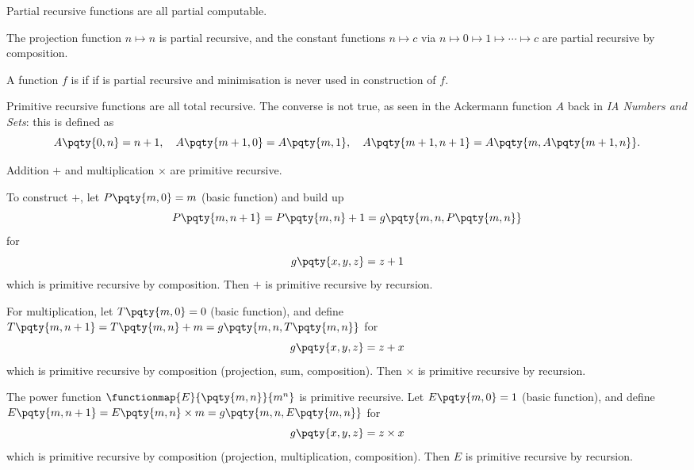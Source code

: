 Partial recursive functions are all partial computable.

\begin{example*}
    The projection function \(n \mapsto n\) is partial recursive, and the constant functions \(n \mapsto c\) via \(n \mapsto 0 \mapsto 1 \mapsto \cdots \mapsto c\) are partial recursive by composition.
\end{example*}

\begin{definition}
    A function \(f\) is  if if is partial recursive and minimisation is never used in construction of \(f\).
\end{definition}

Primitive recursive functions are all total recursive. The converse is not true, as seen in the Ackermann function \(A\) back in \textit{IA Numbers and Sets}: this is defined as
\[
    A\pqty{0, n} = n + 1, \quad A\pqty{m + 1, 0} = A\pqty{m, 1}, \quad A\pqty{m + 1, n + 1} = A\pqty{m, A\pqty{m + 1, n}}.
\]

\begin{example}
    \label{ex:primitive-recursive-addition-multiplication}%
    Addition \(+\) and multiplication \(\times\) are primitive recursive.

    To construct \(+\), let \(P\pqty{m, 0} = m\) (basic function) and build up
    \[
        P\pqty{m, n + 1} = P\pqty{m, n} + 1 = g\pqty{m, n, P\pqty{m, n}}
    \]
    for
    \[
        g\pqty{x, y, z} = z + 1
    \]
    which is primitive recursive by composition. Then \(+\) is primitive recursive by recursion.

    For multiplication, let \(T\pqty{m, 0} = 0\) (basic function), and define \(T\pqty{m, n + 1} = T\pqty{m, n} + m = g\pqty{m, n, T\pqty{m, n}}\) for
    \[
        g\pqty{x, y, z} = z + x
    \]
    which is primitive recursive by composition (projection, sum, composition). Then \(\times\) is primitive recursive by recursion.
\end{example}

\begin{example}
    \label{ex:primitive-recursive-power}%
    The power function \(\functionmap{E}{\pqty{m, n}}{m^n}\) is primitive recursive. Let \(E\pqty{m, 0} = 1\) (basic function), and define \(E\pqty{m, n + 1} = E\pqty{m, n} \times m = g\pqty{m, n, E\pqty{m, n}}\) for
    \[
        g\pqty{x, y, z} = z \times x
    \]
    which is primitive recursive by composition (projection, multiplication, composition). Then \(E\) is primitive recursive by recursion.
\end{example}

